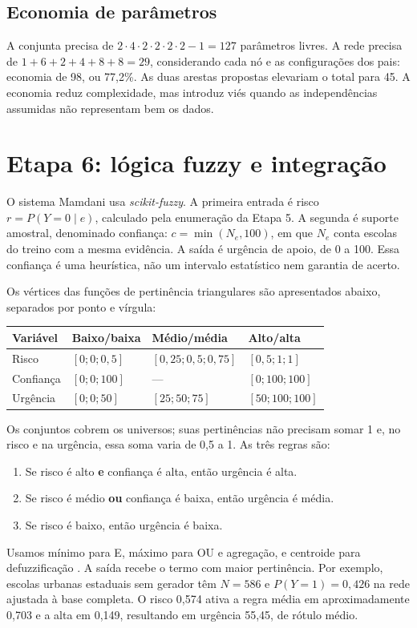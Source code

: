 \documentclass[10pt,a4paper]{article}
\begin{document}
\subsection{Economia de parâmetros}
A conjunta precisa de $2\cdot4\cdot2\cdot2\cdot2\cdot2-1=127$ parâmetros livres. A rede precisa de $1+6+2+4+8+8=29$, considerando cada nó e as configurações dos pais: economia de 98, ou 77,2\%. As duas arestas propostas elevariam o total para 45. A economia reduz complexidade, mas introduz viés quando as independências assumidas não representam bem os dados.

\newpage
\section{Etapa 6: lógica fuzzy e integração}
O sistema Mamdani usa \emph{scikit-fuzzy}. A primeira entrada é risco $r=P(Y=0\mid e)$, calculado pela enumeração da Etapa 5. A segunda é suporte amostral, denominado confiança: $c=\min(N_e,100)$, em que $N_e$ conta escolas do treino com a mesma evidência. A saída é urgência de apoio, de 0 a 100. Essa confiança é uma heurística, não um intervalo estatístico nem garantia de acerto.

Os vértices das funções de pertinência triangulares são apresentados abaixo, separados por ponto e vírgula:
\begin{center}\small
\begin{tabular}{llll}\toprule
Variável & Baixo/baixa & Médio/média & Alto/alta\\\midrule
Risco & $[0;0;0,5]$ & $[0,25;0,5;0,75]$ & $[0,5;1;1]$\\
Confiança & $[0;0;100]$ & --- & $[0;100;100]$\\
Urgência & $[0;0;50]$ & $[25;50;75]$ & $[50;100;100]$\\\bottomrule
\end{tabular}\end{center}
Os conjuntos cobrem os universos; suas pertinências não precisam somar 1 e, no risco e na urgência, essa soma varia de 0,5 a 1. As três regras são:
\begin{enumerate}
\item Se risco é alto \textbf{e} confiança é alta, então urgência é alta.
\item Se risco é médio \textbf{ou} confiança é baixa, então urgência é média.
\item Se risco é baixo, então urgência é baixa.
\end{enumerate}
Usamos mínimo para E, máximo para OU e agregação, e centroide para defuzzificação \cite{zadeh,hullermeier}. A saída recebe o termo com maior pertinência. Por exemplo, escolas urbanas estaduais sem gerador têm $N=586$ e $P(Y=1)=0,426$ na rede ajustada à base completa. O risco 0,574 ativa a regra média em aproximadamente 0,703 e a alta em 0,149, resultando em urgência 55,45, de rótulo médio.
\end{document}
